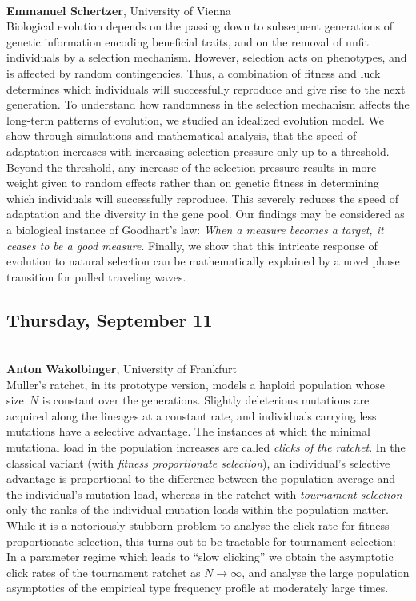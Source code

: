 \documentclass[12pt,a4paper]{article}
\begin{document}
\bigskip\bigskip

\\[1ex]{ \large \textbf{ Emmanuel Schertzer}}, University of Vienna \\[2ex] Biological evolution depends on the passing down to subsequent generations of genetic information encoding beneficial traits, and on the removal of unfit individuals by a selection mechanism. However, selection acts on phenotypes, and is affected by random contingencies. Thus, a combination of fitness and luck determines which individuals will successfully reproduce and give rise to the next generation. To understand how randomness in the selection mechanism affects the long-term patterns of evolution, we studied an idealized evolution model. We show through simulations and mathematical analysis, that the speed of adaptation increases with increasing selection pressure only up to a threshold. Beyond the threshold, any increase of the selection pressure results in more weight given to random effects rather than on genetic fitness in determining which individuals will successfully reproduce. This severely reduces the speed of adaptation and the diversity in the gene pool. Our findings may be considered as a biological instance of  Goodhart's law: {\em When a measure becomes a target, it ceases to be a good measure}. Finally, we show that this intricate response of evolution to natural selection can be mathematically explained by a novel phase transition for pulled traveling waves. 

\bigskip\bigskip

\newpage

\subsection*{\sffamily Thursday, September 11}
\bigskip\bigskip
{}\\[1ex]{ \large \textbf{ Anton Wakolbinger}}, University of Frankfurt \\[2ex] Muller's ratchet, in its prototype version, models a haploid population whose size~$N$ is constant over the generations. Slightly deleterious mutations are acquired along the lineages at a constant rate, and individuals carrying less mutations have a selective advantage. The instances at which the minimal mutational load in the population increases are called {\em clicks of the ratchet}.  In the classical variant (with {\em fitness proportionate selection}), an individual's selective advantage is proportional to the difference between the population average and the individual's mutation load, whereas in the ratchet with {\em  tournament selection}  only the ranks of the  individual mutation loads within the population matter. While it is a notoriously stubborn problem to analyse the click rate for fitness proportionate selection, this turns out to be tractable for tournament selection:   In a parameter regime which leads to ``slow clicking'' we obtain the  asymptotic click rates of the tournament ratchet as $N\to \infty$, and analyse the large population asymptotics of the empirical type frequency profile at moderately large times. 
\end{document}
